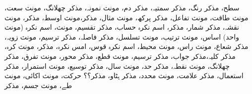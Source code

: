 سطح، مذکر
رنگ، مذکر
سمتیہ، مذکر
دم، مونث
نمونہ، مذکر
چھلانگ، مونث
سعت، مونث
طاقت، مونث
تفاعل، مذکر
پرکھ، مونث
مثال، مذکر،مونث
اوسط، مذکر، مونث
نقشہ، مذکر
شمار، مذکر، اسم نکرہ
حساب، مذکر
تقسیم، مونث، اسم نکرہ (مونث واحد)
اساس، مونث
ترتیب، مونث
تسلسل، مذکر
فاصلہ، مذکر
ترسیم، مونث
زویہ، مذکر
شعاع، مونث
راس، مونث
محیط، اسم نکرہ
قوس، امس نکرہ، مذکر، مونث
کرہ، مذکر
کلیہ،مذکر
جواب، مذکر
ترسیم، مونث
قطع، مذکر
محور، مونث
تفرق، مذکر
چھلانگ، مونث
نقطہ، مذکر
حد، مونث
سال، مذکر
توسیع، مونث
استمرار، مذکر
استعمال، مذکر
علامت، مونث
محدد، مذکر
ہٹاو، مذکر؟؟
حرکت، مونث
اکائی، مونث
طے، مونث
جسم، مذکر

